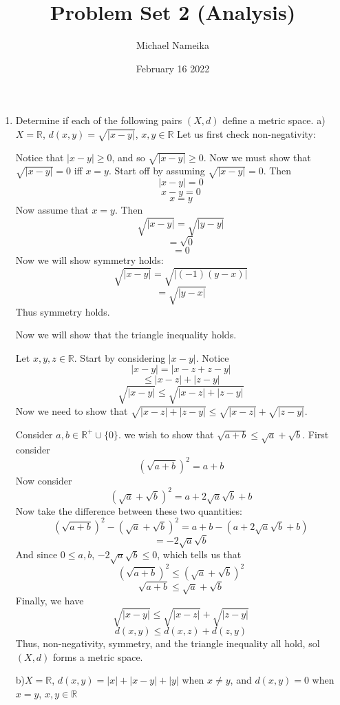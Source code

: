 \documentclass{article}
\title{Problem Set 2 (Analysis)}
\author{Michael Nameika}
\date{February 16 2022}
\begin{document}
\maketitle

\begin{enumerate}
    \item Determine if each of the following pairs $(X,d)$ define a metric space.
    a) $X = \mathbb{R}$, $d(x,y) = \sqrt{|x - y|}$, $x,y \in \mathbb{R}$
    \newline
    Let us first check non-negativity: 
    
    Notice that $|x-y| \geq 0$, and so $\sqrt{|x-y|} \geq 0$. Now we must show that $\sqrt{|x - y|} = 0$ iff $x = y$. Start off by assuming $\sqrt{|x - y|} = 0$.
    Then 
    \[|x-y| = 0\]
    \[x-y = 0\]
    \[x = y\]
    Now assume that $x = y$. Then
    \[\sqrt{|x - y|} = \sqrt{|y - y|}\]
    \[= \sqrt{0}\]
    \[= 0\]
    Now we will show symmetry holds:
    \[\sqrt{|x - y|} = \sqrt{|(-1)(y - x)|}\]
    \[ = \sqrt{|y - x|}\]
    Thus symmetry holds.
    
    Now we will show that the triangle inequality holds.
    
    Let $x,y,z \in \mathbb{R}$. Start by considering $|x - y|$. Notice
    \[|x - y| = |x - z + z - y|\]
    \[\leq |x - z| + |z - y|\]
    \[\sqrt{|x - y|} \leq \sqrt{|x-z| + |z - y|}\]
    Now we need to show that $\sqrt{|x - z| + |z - y|} \leq \sqrt{|x - z|} + \sqrt{|z - y|}$. 
    
    Consider $a,b \in \mathbb{R^+} \cup \{ 0 \}$. we wish to show that $\sqrt{a + b} \leq \sqrt{a} + \sqrt{b}$. First consider
    \[(\sqrt{a + b})^2 = a + b\]
    Now consider
    \[(\sqrt{a} + \sqrt{b})^2 = a + 2\sqrt{a}\sqrt{b} + b\]
    Now take the difference between these two quantities:
    \[(\sqrt{a + b})^2 - (\sqrt{a} + \sqrt{b})^2 = a + b - (a + 2\sqrt{a}\sqrt{b} + b)\]
    \[ = -2\sqrt{a}\sqrt{b}\]
    And since $0 \leq a,b$, $-2\sqrt{a}\sqrt{b} \leq 0$, which tells us that 
    \[(\sqrt{a + b})^2 \leq (\sqrt{a} + \sqrt{b})^2\]
    \[\sqrt{a + b} \leq \sqrt{a} + \sqrt{b}\]
    Finally, we have
    \[\sqrt{|x - y|} \leq \sqrt{|x - z|} + \sqrt{|z - y|}\]
    \[d(x,y) \leq d(x,z) + d(z,y)\]
    Thus, non-negativity, symmetry, and the triangle inequality all hold, sol $(X,d)$ forms a metric space.
    \newline
    
    
    b)$X = \mathbb{R}$, $d(x,y) = |x| + |x - y| + |y|$ when $x \neq y$, and $d(x,y) = 0$ when $x = y$, $x,y \in \mathbb{R}$
    

\end{enumerate}
\end{document}
